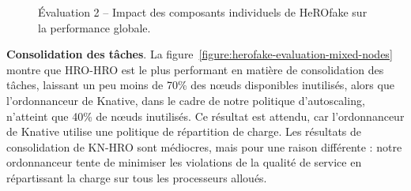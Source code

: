 \begin{figure}[!ht]
    \centering
    \qquad
    \qquad
    \caption{Évaluation 2 -- Impact des composants individuels de HeROfake sur la performance globale.}
    \label{figure:herofake-evaluation-hro-mixed}
\end{figure}

\textbf{Consolidation des tâches}. La figure~\ref{figure:herofake-evaluation-mixed-nodes} montre que HRO-HRO est le plus performant en matière de consolidation des tâches, laissant un peu moins de 70\% des nœuds disponibles inutilisés, alors que l'ordonnanceur de Knative, dans le cadre de notre politique d'autoscaling, n'atteint que 40\% de nœuds inutilisés. Ce résultat est attendu, car l'ordonnanceur de Knative utilise une politique de répartition de charge. Les résultats de consolidation de KN-HRO sont médiocres, mais pour une raison différente : notre ordonnanceur tente de minimiser les violations de la qualité de service en répartissant la charge sur tous les processeurs alloués.

